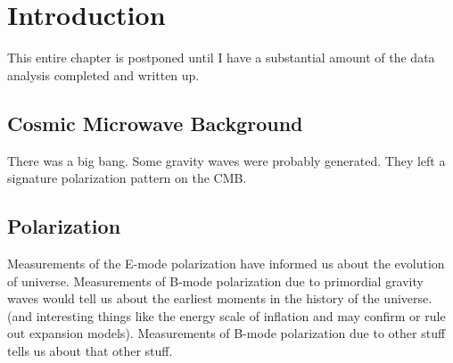 \chapter{Introduction}
\label{intro_chapter}

This entire chapter is postponed until I have a substantial amount of the data analysis completed and written up. 


\section{Cosmic Microwave Background}
\label{sec:cmb_science}
There was a big bang. Some gravity waves were probably generated. They left a signature polarization pattern on the CMB. 

\section{Polarization}
\label{sec:polarization}
Measurements of the E-mode polarization have informed us about the evolution of universe. 
Measurements of B-mode polarization due to primordial gravity waves would tell us about the earliest moments in the history of the universe. (and interesting things like the energy scale of inflation and may confirm or rule out expansion models).
Measurements of B-mode polarization due to other stuff tells us about that other stuff. 


